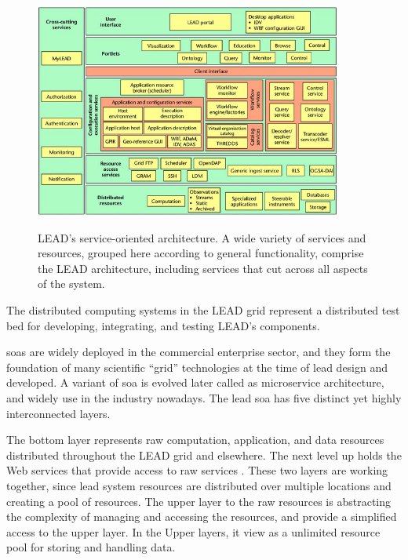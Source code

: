 \begin{figure}[htp]
    \centering
    \includegraphics[width=0.9\textwidth]{lead/LEADs-service-oriented-architecture-A-wide-variety-of-services-and-resources-grouped_W640.jpg}\\
    \caption{LEAD’s service-oriented architecture. A wide variety of services and resources, grouped here according to general functionality, comprise the LEAD architecture, including services that cut across all aspects of the system. \cite{Droegemeier2005Service-OrientedWeather} }
    \label{fi:lead_soa}
\end{figure}

The distributed computing systems in the LEAD grid represent a distributed test bed for developing, integrating, and testing LEAD’s components.

\acrshort{soa}s are widely deployed in the commercial enterprise sector, and they form the foundation of many scientific “grid” technologies at the time of \acrshort{lead} design and developed. A variant of \acrshort{soa} is evolved later called as microservice architecture, and widely use in the industry nowadays. The \acrshort{lead} \acrshort{soa} has five distinct yet highly interconnected layers. 

The bottom layer represents raw computation, application, and data resources distributed throughout the LEAD grid and elsewhere. The next level up holds the Web services that provide access to raw services \cite{Droegemeier2005Service-OrientedWeather}. These two layers are working together, since \acrshort{lead} system resources are distributed over multiple locations and creating a pool of resources. The upper layer to the raw resources is abstracting the complexity of managing and accessing the resources, and provide a simplified access to the upper layer. In the Upper layers, it view as a unlimited resource pool for storing and handling data.

